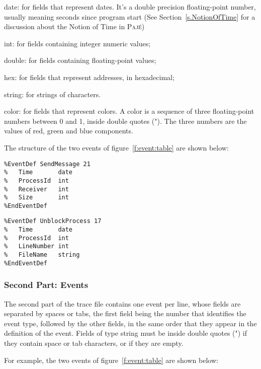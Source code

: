 \documentclass[12pt]{article}
\newcommand{\Paje}{\textsc{Paj\'e}\xspace}
\newenvironment{description*}%
               {\vspace{-1em}
                 \begin{description}%
                   \setlength{\itemsep}{0pt}%
                   \setlength{\parskip}{0pt}}%
               {\end{description}}
\begin{document}
\begin{description*}
  \item [date:] for fields that represent dates. It's a double
    precision floating-point number, usually meaning seconds since
    program start (See Section~\ref{s.NotionOfTime} for a discussion
    about the Notion of Time in \Paje)
  \item [int:] for fields containing integer numeric values;
  \item [double:] for fields containing floating-point values;
  \item [hex:] for fields that represent addresses, in hexadecimal;
  \item [string:] for strings of characters.
  \item [color:] for fields that represent colors. A color is a sequence of
                 three floating-point numbers between 0 and 1, inside double 
                 quotes (").
                 The three numbers are the values of red, green and blue
                 components.
\end{description*}

The structure of the two events of figure~\ref{f:event:table} are
shown below:

\begin{verbatim}
%EventDef SendMessage 21
%   Time       date
%   ProcessId  int
%   Receiver   int
%   Size       int
%EndEventDef
\end{verbatim}

\begin{verbatim}
%EventDef UnblockProcess 17
%   Time       date
%   ProcessId  int
%   LineNumber int
%   FileName   string
%EndEventDef
\end{verbatim}

\subsubsection*{Second Part: Events}

The second part of the trace file contains one event per line, whose
fields are separated by spaces or tabs, the first field being the
number that identifies the event type, followed by the other fields,
in the same order that they appear in the definition of the event.
Fields of type string must be inside double quotes (") if they contain
space or tab characters, or if they are empty.

For example, the two events of figure~\ref{f:event:table} are shown
below:
\end{document}
